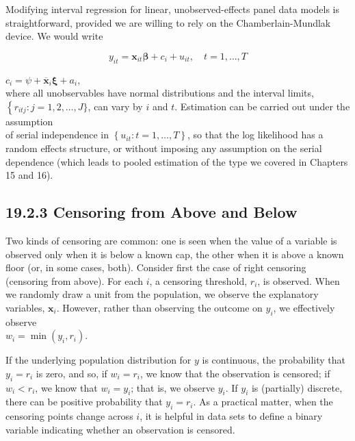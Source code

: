 \documentclass[10pt]{article}
\begin{document}
Modifying interval regression for linear, unobserved-effects panel data models is straightforward, provided we are willing to rely on the Chamberlain-Mundlak device. We would write


\begin{equation*}
y_{i t}=\mathbf{x}_{i t} \boldsymbol{\beta}+c_{i}+u_{i t}, \quad t=1, \ldots, T \tag{19.14}
\end{equation*}


$c_{i}=\psi+\overline{\mathbf{x}}_{i} \boldsymbol{\xi}+a_{i}$,\\
where all unobservables have normal distributions and the interval limits, $\left\{r_{i t j}: j=\right. 1,2, \ldots, J\}$, can vary by $i$ and $t$. Estimation can be carried out under the assumption\\
of serial independence in $\left\{u_{i t}: t=1, \ldots, T\right\}$, so that the log likelihood has a random effects structure, or without imposing any assumption on the serial dependence (which leads to pooled estimation of the type we covered in Chapters 15 and 16).

\subsection*{19.2.3 Censoring from Above and Below}
Two kinds of censoring are common: one is seen when the value of a variable is observed only when it is below a known cap, the other when it is above a known floor (or, in some cases, both). Consider first the case of right censoring (censoring from above). For each $i$, a censoring threshold, $r_{i}$, is observed. When we randomly draw a unit from the population, we observe the explanatory variables, $\mathbf{x}_{i}$. However, rather than observing the outcome on $y_{i}$, we effectively observe\\
$w_{i}=\min \left(y_{i}, r_{i}\right)$.

If the underlying population distribution for $y$ is continuous, the probability that $y_{i}=r_{i}$ is zero, and so, if $w_{i}=r_{i}$, we know that the observation is censored; if $w_{i}<r_{i}$, we know that $w_{i}=y_{i}$; that is, we observe $y_{i}$. If $y_{i}$ is (partially) discrete, there can be positive probability that $y_{i}=r_{i}$. As a practical matter, when the censoring points change across $i$, it is helpful in data sets to define a binary variable indicating whether an observation is censored.
\end{document}
